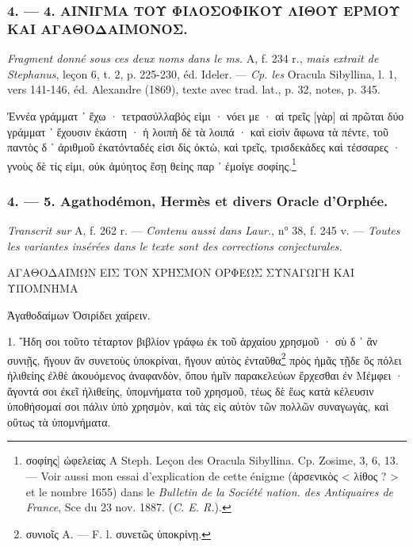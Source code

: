 \documentclass[a4paper, 11pt, oneside, polutonikogreek, french]{article}
\begin{document}
\bigskip
\centerline{\EightStarTaper}
\centerline{\EightStarTaper\EightStarTaper}
\bigskip

\subsubsection{4. --- 4. ΑΙΝΙΓΜΑ ΤΟΥ ΦΙΛΟΣΟΦΙΚΟΥ ΛΙΘΟΥ ΕΡΜΟΥ ΚΑΙ ΑΓΑΘΟΔΑΙΜΟΝΟΣ.}

\emph{Fragment donné sous ces deux noms dans le ms.} A, f. 234 r., \emph{mais extrait de Stephanus}, leçon 6, t. 2, p. 225-230, éd. Ideler. --- \emph{Cp. les} Oracula Sibyllina, l. 1, vers 141-146, éd. Alexandre (1869), texte avec trad. lat., p. 32, notes, p. 345.

Ἐννέα γράμματ ᾽ ἔχω · τετρασύλλαβός εἰμι · νόει με ·  
αἱ τρεῖς [γὰρ] αἱ πρῶται δύο γράμματ ᾽ ἔχουσιν ἑκάστη ·  
ἡ λοιπὴ δὲ τὰ λοιπά · καὶ εἰσὶν ἄφωνα τὰ πέντε,  
τοῦ παντὸς δ ᾽ ἀριθμοῦ ἑκατόνταδές εἰσι δὶς ὀκτὼ,  
καὶ τρεῖς, τρισδεκάδες καὶ τέσσαρες · γνοὺς δὲ τίς εἰμι,  
οὐκ ἀμύητος ἔσῃ θείης παρ ᾽ ἐμοίγε σοφίης.\footnote{σοφίης] ὠφελείας A Steph. Leçon des Oracula Sibyllina. Cp. Zosime, 3, 6, 13. --- Voir aussi mon essai d'explication de cette énigme (ἀρσενικὸς < λίθος ? > et le nombre 1655) dans le \emph{Bulletin de la Société nation. des Antiquaires de France}, Sce du 23 nov. 1887. (\emph{C. E. R.}).}

\bigskip
\centerline{\EightStarTaper}
\centerline{\EightStarTaper\EightStarTaper}
\bigskip

\subsubsection{4. --- 5. Agathodémon, Hermès et divers Oracle d'Orphée.}

\emph{Transcrit sur} A, f. 262 r. --- \emph{Contenu aussi dans Laur.}, n° 38, f. 245 v. --- \emph{Toutes les variantes insérées dans le texte sont des corrections conjecturales.}

ΑΓΑΘΟΔΑΙΜΩΝ ΕΙΣ ΤΟΝ ΧΡΗΣΜΟΝ ΟΡΦΕΩΣ ΣΥΝΑΓΩΓΗ ΚΑΙ ΥΠΟΜΝΗΜΑ

Ἀγαθοδαίμων Ὀσιρίδει χαίρειν.

1. Ἤδη σοι τοῦτο τέταρτον βιβλίον γράφω ἐκ τοῦ ἀρχαίου χρησμοῦ · σὺ δ ᾽ ἂν συνιῇς, ἤγουν ἂν συνετοὺς ὑποκρίναι, ἤγουν αὐτὸς ἐνταῦθα\footnote{συνιοῖς A. --- F. l. συνετῶς ὑποκρίνῃ.} πρὸς ἡμᾶς τῇδε ὃς πόλει ἠλιθείης ἐλθὲ ἀκουόμενος ἀναφανδὸν, ὅπου ἡμῖν παρακελεύων ἔρχεσθαι ἐν Μέμφει · ἄγοντά σοι ἐκεῖ ἠλιθείης, ὑπομνήματα τοῦ χρησμοῦ, τέως δὲ ἕως κατὰ κέλευσιν ὑποθήσομαί σοι πάλιν ὑπὸ χρησμὸν, καὶ τὰς εἰς αὐτὸν τῶν πολλῶν συναγωγὰς, καὶ οὕτως τὰ ὑπομνήματα.
\end{document}
